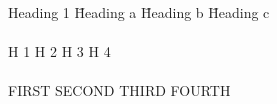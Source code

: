 \documentclass[12pt]{article}
\begin{document}
  
                      \begin{center}  
               \begin{tabbing}Heading 1 \= Heading a \= Heading b \= Heading c \\ \\  
                H 1 \> H 2 \> H 3 \> H 4 \\ \\  
               FIRST \> SECOND \> THIRD \> FOURTH  
                      \end{tabbing}  
             \end{center}  
     
\end{document}
